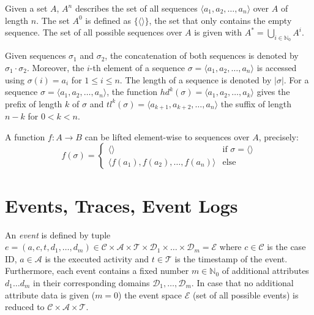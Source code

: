Given a set $A$, $A^n$ describes the set of all sequences $\langle a_1, a_2, \dots, a_n\rangle$ over $A$ of length $n$.
The set $A^0$ is defined as $\{\langle \rangle\}$, the set that only contains the empty sequence.
The set of all possible sequences over $A$ is given with $A^* = \bigcup\limits_{i\in \mathbb{N}_0} A^i$.

Given sequences $\sigma_1$ and $\sigma_2$, the concatenation of both sequences is denoted by $\sigma_1 \cdot \sigma_2$.
Moreover, the $i$-th element of a sequence $\sigma = \langle a_1, a_2, \dots, a_n\rangle$ is accessed using $\sigma(i)= a_i$ for $1 \leq i \leq n$.
The length of a sequence is denoted by $|\sigma|$.
For a sequence $\sigma=\langle a_1, a_2, \dots, a_n\rangle$, the function
$hd^k(\sigma)= \langle a_1, a_2, \dots, a_k\rangle$ gives the prefix of length $k$ of $\sigma$ and $tl^k(\sigma)= \langle a_{k+1}, a_{k+2}, \dots, a_n\rangle$ the suffix of length $n-k$ for $0 < k < n$.

A function $f \colon A \to B$ can be lifted element-wise to sequences over $A$, precisely:
\begin{equation*}
f(\sigma) =
\begin{cases}
\langle \rangle & \text{if $\sigma = \langle \rangle$} \\
\langle f(a_1), f(a_2), \dots, f(a_n)\rangle & \text{else} 
\end{cases}
\end{equation*}

\section{Events, Traces, Event Logs}

\begin{definition}[Event]
An  \textit{event} is defined by tuple $e = (a,c,t,d_1,\dots, d_m) \in \mathcal{C} \times \mathcal{A}  \times \mathcal{T} \times \mathcal{D}_1 \times \dots \times \mathcal{D}_m =  \mathcal{E}$ where  $c \in \mathcal{C} $ is the case ID, $a \in \mathcal{A}$ is the executed activity and $t \in \mathcal{T}$ is the timestamp of the event.
Furthermore, each event contains a fixed number $m \in \mathbb{N}_0$ of additional attributes $d_1 \dots d_m$ in their corresponding domains $\mathcal{D}_1, \dots , \mathcal{D}_m$.
In case that no additional attribute data is given ($m = 0$) the event space $\mathcal{E}$ (set of all possible events) is reduced to $\mathcal{C} \times \mathcal{A}  \times \mathcal{T}$.
\end{definition}

